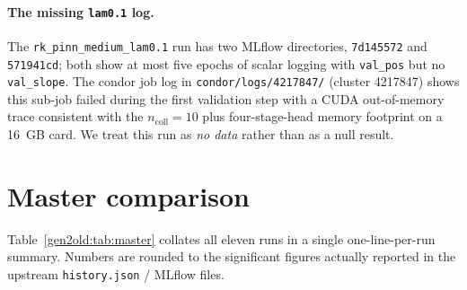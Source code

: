 \documentclass[a4paper,11pt]{article}
\newcommand{\SI}[2]{#1~#2}
\begin{document}
\paragraph{The missing \texttt{lam0.1} log.}
The \texttt{rk\_pinn\_medium\_lam0.1} run has two MLflow directories,
\texttt{7d145572} and \texttt{571941cd}; both show at most five epochs of
scalar logging with \texttt{val\_pos} but no \texttt{val\_slope}. The
condor job log in \texttt{condor/logs/4217847/} (cluster 4217847) shows
this sub-job failed during the first validation step with a CUDA
out-of-memory trace consistent with the $n_{\mathrm{coll}}=10$ plus
four-stage-head memory footprint on a \SI{16}{GB} card. We treat this
run as \emph{no data} rather than as a null result.

\section{Master comparison}\label{gen2old:sec:master}

Table~\ref{gen2old:tab:master} collates all eleven runs in a single
one-line-per-run summary. Numbers are rounded to the significant figures
actually reported in the upstream \texttt{history.json} / MLflow files.
\end{document}
